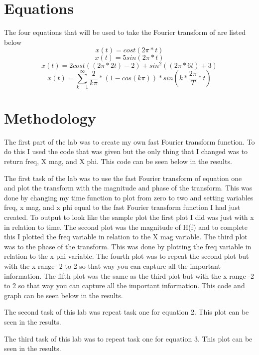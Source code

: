 \documentclass[11pt,a4]{report}
\begin{document}
\section{Equations}
The four equations that will be used to take the Fourier transform of are listed below
\begin{equation}
    x(t) = cost(2\pi*t)
\end{equation}
\begin{equation}
    x(t) = 5sin(2\pi*t)
\end{equation}
\begin{equation}
  x(t) = 2cost((2\pi *2t)-2) + sin^2((2\pi * 6t)+3)
\end{equation}
\begin{equation}
        x(t) = \sum_{k=1}^{\infty} \frac{2}{k\pi}*(1-cos(k\pi))*sin(k*\frac{2\pi}{T}*t)
\end{equation}

\section{Methodology}
The first part of the lab was to create my own fast Fourier transform function. To do this I used the code that was given but the only thing that I changed was to return freq, X mag, and X phi. This code can be seen below in the results. 

The first task of the lab was to use the fast Fourier transform of equation one and plot the transform with the magnitude and phase of the transform. This was done by changing my time function to plot from zero to two and setting variables freq, x mag, and x phi equal to the fast Fourier transform function I had just created. To output to look like the sample plot the first plot I did was just with x in relation to time. The second plot was the magnitude of H(f) and to complete this I plotted the freq variable in relation to the X mag variable. The third plot was to the phase of the transform. This was done by plotting the freq variable in relation to the x phi variable. The fourth plot was to repeat the second plot but with the x range -2 to 2 so that way you can capture all the important information. The fifth plot was the same as the third plot but with the x range -2 to 2 so that way you can capture all the important information. This code and graph can be seen below in the results. 

The second task of this lab was repeat task one for equation 2. This plot can be seen in the results.

The third task of this lab was to repeat task one for equation 3. This plot can be seen in the results.
\end{document}
